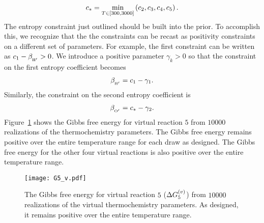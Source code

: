 \documentclass[fontsize=12pt, %
               paper=a4, %
               hyperref]{report}
\begin{document}
  \begin{align}
    c_{*} = \min_{T\in\left[300, 3000\right]}\left(c_{2}, c_{3}, c_{4}, c_{5}\right).
  \end{align}
  The entropy constraint just outlined should be built into the prior.  To 
  accomplish this, we recognize that the the constraints can be recast as 
  positivity constraints on a different set of parameters.  For example, the first 
  constraint can be written as $c_{1} - \beta_{_{\ce{H}^{\prime}}} > 0$. 
  We introduce a positive parameter $\gamma_{k} > 0$ so that the  
  constraint on the first entropy coefficient becomes 
  \begin{align}
    \beta_{_{\ce{H}^{\prime}}} = c_{1} - \gamma_{1}.
  \end{align}
  Similarly, the constraint on the second entropy coefficient is 
  \begin{align}
    \beta_{_{\ce{O}^{\prime}}} = c_{*} - \gamma_{2}.
  \end{align}
  Figure~\ref{fig:G5v} shows the Gibbs free energy for virtual 
  reaction $5$ from $10000$ realizations of the thermochemistry 
  parameters.  The Gibbs free energy remains positive over the 
  entire temperature range for each draw as designed.  The Gibbs 
  free energy for the other four virtual reactions is also positive 
  over the entire temperature range.
  \begin{figure}[h!]
    \centering
    \texttt{[image: G5\_v.pdf]}
    \caption{The Gibbs free energy for virtual reaction $5$
             ($\Delta G_{5}^{\left(v\right)}$) from $10000$ realizations 
             of the virtual thermochemistry parameters.  As 
             designed, it remains positive over the entire 
             temperature range.}
    \label{fig:G5v}
  \end{figure}
  
\end{document}

